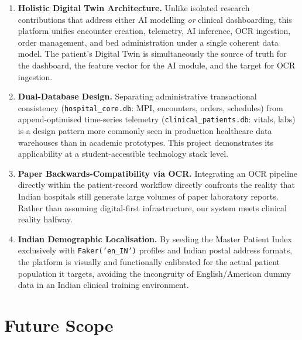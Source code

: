 \documentclass[12pt,a4paper]{article}
\begin{document}
\begin{enumerate}[label=\textbf{\arabic*.}, leftmargin=*, itemsep=4pt]
  \item \textbf{Holistic Digital Twin Architecture.}  Unlike isolated research
        contributions that address either AI modelling \textit{or} clinical dashboarding,
        this platform unifies encounter creation, telemetry, AI inference, OCR ingestion,
        order management, and bed administration under a single coherent data model.
        The patient's Digital Twin is simultaneously the source of truth for the
        dashboard, the feature vector for the AI module, and the target for OCR ingestion.
  \item \textbf{Dual-Database Design.}  Separating administrative transactional
        consistency (\texttt{hospital\_core.db}: MPI, encounters, orders, schedules)
        from append-optimised time-series telemetry (\texttt{clinical\_patients.db}:
        vitals, labs) is a design pattern more commonly seen in production healthcare
        data warehouses than in academic prototypes.  This project demonstrates its
        applicability at a student-accessible technology stack level.
  \item \textbf{Paper Backwards-Compatibility via OCR.}  Integrating an OCR pipeline
        directly within the patient-record workflow directly confronts the reality that
        Indian hospitals still generate large volumes of paper laboratory reports.
        Rather than assuming digital-first infrastructure, our system meets clinical
        reality halfway.
  \item \textbf{Indian Demographic Localisation.}  By seeding the Master Patient Index
        exclusively with \texttt{Faker('en\_IN')} profiles and Indian postal address
        formats, the platform is visually and functionally calibrated for the actual
        patient population it targets, avoiding the incongruity of English/American dummy
        data in an Indian clinical training environment.
\end{enumerate}

\section{Future Scope}
\end{document}
